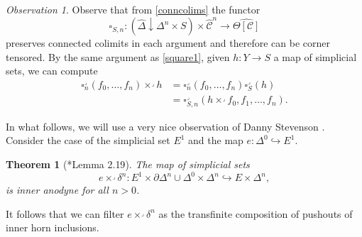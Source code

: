\documentclass[leqno]{article}
\numberwithin{equation}{subsection}
\theoremstyle{plain}   %
\newtheorem{thm}[equation]{Theorem}
\theoremstyle{remark}
\newtheorem{obs}[equation]{Observation}
\theoremstyle{plain}
\newcommand{\overcat}[2]{{\left(#1\downarrow #2\right)}}
\newcommand{\psh}[1]{\ensuremath{\widehat{#1}}}
\newcommand{\C}{\ensuremath{\mathcal{C}}}
\newcommand{\cellset}{\ensuremath{\widehat{\Theta[\mathcal{C}]}}}
\begin{document}
\begin{obs}\label{joyalsquare1}
	Observe that from \ref{conncolims} the functor 
	\[\square_{S,n}:\overcat{\psh{\Delta}}{\Delta^n\times S} \times\psh{\C}^n \to \cellset\]
	preserves connected colimits in each argument and therefore can be corner tensored. By the same argument as \ref{square1}, given \(h:Y\to S\) a map of simplicial sets, we can compute 
	\begin{align*}
		\square^\lrcorner_n(f_0,\dots,f_n) \times^\lrcorner h &= \square^\lrcorner_n(f_0,\dots,f_n) \square_S^\lrcorner(h)\\
		&= \square^\lrcorner_{S,n}(h\times^\lrcorner f_0,f_1,\dots,f_n).
	\end{align*}
\end{obs}

In what follows, we will use a very nice observation of Danny Stevenson \cite{danny}.  Consider the case of the simplicial set \(E^1\) and the map \(e:\Delta^0 \hookrightarrow E^1\).  
\begin{thm}[\cite{danny}*{Lemma 2.19}]\label{dannythm}
	The map of simplicial sets
	\[e\times^\lrcorner \delta^n: E^1\times \partial\Delta^n \cup \Delta^0 \times \Delta^n \hookrightarrow E\times \Delta^n,\]
	is inner anodyne for all \(n>0\).  
\end{thm}
It follows that we can filter \(e\times^\lrcorner \delta^n\) as the transfinite composition of pushouts of inner horn inclusions.
\end{document}
